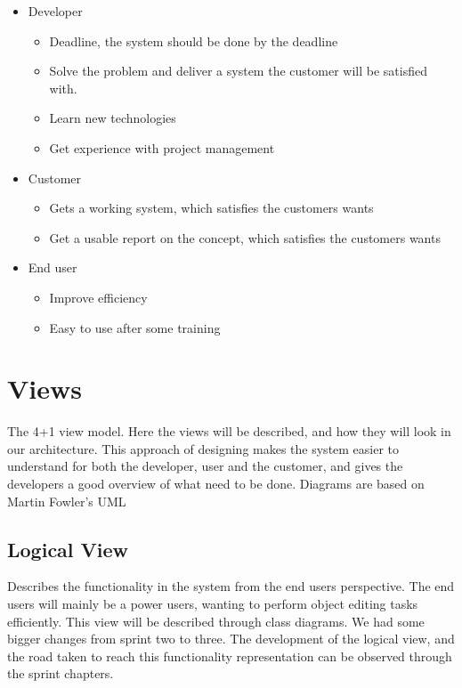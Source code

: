 \begin{itemize}
    \item Developer
    \begin{itemize}
        \item Deadline, the system should be done by the deadline
        \item Solve the problem and deliver a system the customer will be satisfied with.
        \item Learn new technologies
        \item Get experience with project management
        \end{itemize}
    \item Customer
    \begin{itemize}
        \item Gets a working system, which satisfies the customers wants
        \item Get a usable report on the concept, which satisfies the customers wants
    \end{itemize}
    \item End user
    \begin{itemize}
        \item Improve efficiency
        \item Easy to use after some training
    \end{itemize}
\end{itemize}



\section{Views} \label{Views}
The 4+1 view model\cite{Kruchten}. Here the views will be described, and how they will look in our architecture. This approach of designing makes the system easier to understand for both the developer, user and the customer, and gives the developers a good overview of what need to be done. Diagrams are based on Martin Fowler's UML\cite{Fowl04}

\subsection{Logical View}
Describes the functionality in the system from the end users perspective. The end users will mainly be a power users, wanting to perform object editing tasks efficiently. This view will be described through class diagrams.  We had some bigger changes from sprint two to three. The development of the logical view, and the road taken to reach this functionality representation can be observed through the sprint chapters.

